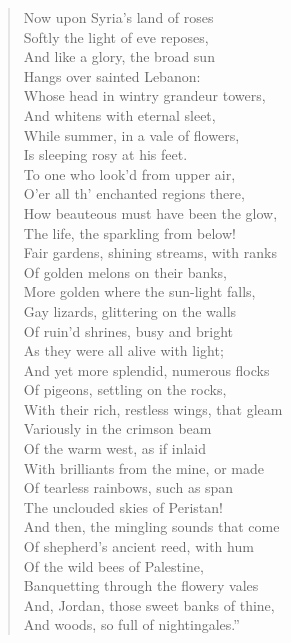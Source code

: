 \begin{verse}
  Now upon Syria's land of roses\\
  Softly the light of eve reposes,\\
  And like a glory, the broad sun\\
  Hangs over sainted Lebanon:\\
  Whose head in wintry grandeur towers,\\
  And whitens with eternal sleet,\\
  While summer, in a vale of flowers,\\
  Is sleeping rosy at his feet.\\
  To one who look'd from upper air,\\
  O'er all th' enchanted regions there,\\
  How beauteous must have been the glow,\\
  The life, the sparkling from below!\\
  Fair gardens, shining streams, with ranks\\
  Of golden melons on their banks,\\
  More golden where the sun-light falls,\textemdash \\
  Gay lizards, glittering on the walls\\
  Of ruin'd shrines, busy and bright\\
  As they were all alive with light;\textemdash \\
  And yet more splendid, numerous flocks\\
  Of pigeons, settling on the rocks,\\
  With their rich, restless wings, that gleam\\
  Variously in the crimson beam\\
  Of the warm west, as if inlaid\\
  With brilliants from the mine, or made\\
  Of tearless rainbows, such as span\\
  The unclouded skies of Peristan!\\
  And then, the mingling sounds that come\\
  Of shepherd's ancient reed, with hum\\
  Of the wild bees of Palestine,\\
  Banquetting through the flowery vales\textemdash \\
  And, Jordan, those sweet banks of thine,\\
  And woods, so full of nightingales.''\textemdash 
\end{verse}

